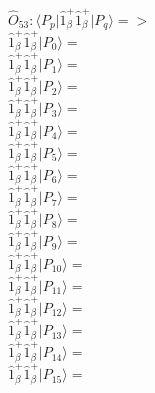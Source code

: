 \documentclass[14pt]{article}
\begin{document}
    $\hat{O}_{53}:  \langle{P_p}\vert \hat{1}_{\beta}^{+}\hat{1}_{\beta}^{+} \vert{P_q}\rangle => $ \\ 
    $ \hat{1}_{\beta}^{+}\hat{1}_{\beta}^{+} \vert{P_{0}}\rangle =  $ \\ 
    $ \hat{1}_{\beta}^{+}\hat{1}_{\beta}^{+} \vert{P_{1}}\rangle =  $ \\ 
    $ \hat{1}_{\beta}^{+}\hat{1}_{\beta}^{+} \vert{P_{2}}\rangle =  $ \\ 
    $ \hat{1}_{\beta}^{+}\hat{1}_{\beta}^{+} \vert{P_{3}}\rangle =  $ \\ 
    $ \hat{1}_{\beta}^{+}\hat{1}_{\beta}^{+} \vert{P_{4}}\rangle =  $ \\ 
    $ \hat{1}_{\beta}^{+}\hat{1}_{\beta}^{+} \vert{P_{5}}\rangle =  $ \\ 
    $ \hat{1}_{\beta}^{+}\hat{1}_{\beta}^{+} \vert{P_{6}}\rangle =  $ \\ 
    $ \hat{1}_{\beta}^{+}\hat{1}_{\beta}^{+} \vert{P_{7}}\rangle =  $ \\ 
    $ \hat{1}_{\beta}^{+}\hat{1}_{\beta}^{+} \vert{P_{8}}\rangle =  $ \\ 
    $ \hat{1}_{\beta}^{+}\hat{1}_{\beta}^{+} \vert{P_{9}}\rangle =  $ \\ 
    $ \hat{1}_{\beta}^{+}\hat{1}_{\beta}^{+} \vert{P_{10}}\rangle =  $ \\ 
    $ \hat{1}_{\beta}^{+}\hat{1}_{\beta}^{+} \vert{P_{11}}\rangle =  $ \\ 
    $ \hat{1}_{\beta}^{+}\hat{1}_{\beta}^{+} \vert{P_{12}}\rangle =  $ \\ 
    $ \hat{1}_{\beta}^{+}\hat{1}_{\beta}^{+} \vert{P_{13}}\rangle =  $ \\ 
    $ \hat{1}_{\beta}^{+}\hat{1}_{\beta}^{+} \vert{P_{14}}\rangle =  $ \\ 
    $ \hat{1}_{\beta}^{+}\hat{1}_{\beta}^{+} \vert{P_{15}}\rangle =  $ \\ 
    
\end{document}
